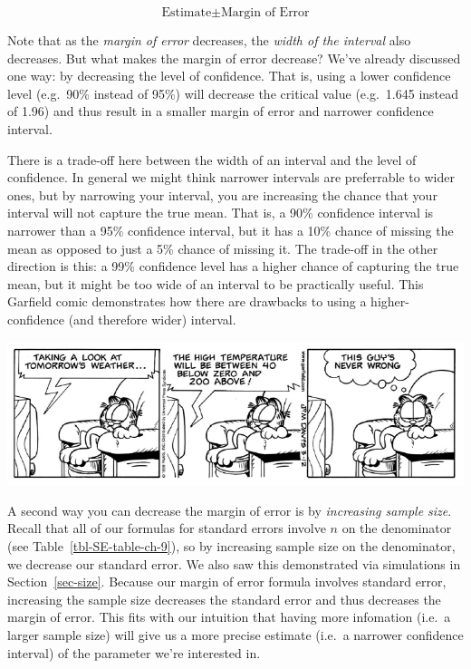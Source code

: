 \documentclass[
  letterpaper,
  DIV=11,
  numbers=noendperiod]{scrreprt}
\theoremstyle{definition}
\theoremstyle{remark}
\begin{document}
\[\text{Estimate} \pm \text{Margin of Error}\]

Note that as the \emph{margin of error} decreases, the \emph{width of
the interval} also decreases. But what makes the margin of error
decrease? We've already discussed one way: by decreasing the level of
confidence. That is, using a lower confidence level (e.g.~90\% instead
of 95\%) will decrease the critical value (e.g.~1.645 instead of 1.96)
and thus result in a smaller margin of error and narrower confidence
interval.

There is a trade-off here between the width of an interval and the level
of confidence. In general we might think narrower intervals are
preferrable to wider ones, but by narrowing your interval, you are
increasing the chance that your interval will not capture the true mean.
That is, a 90\% confidence interval is narrower than a 95\% confidence
interval, but it has a 10\% chance of missing the mean as opposed to
just a 5\% chance of missing it. The trade-off in the other direction is
this: a 99\% confidence level has a higher chance of capturing the true
mean, but it might be too wide of an interval to be practically useful.
This Garfield comic demonstrates how there are drawbacks to using a
higher-confidence (and therefore wider) interval.

\includegraphics{images/garfield_comic.png}

A second way you can decrease the margin of error is by \emph{increasing
sample size}. Recall that all of our formulas for standard errors
involve \(n\) on the denominator (see Table~\ref{tbl-SE-table-ch-9}), so
by increasing sample size on the denominator, we decrease our standard
error. We also saw this demonstrated via simulations in
Section~\ref{sec-size}. Because our margin of error formula involves
standard error, increasing the sample size decreases the standard error
and thus decreases the margin of error. This fits with our intuition
that having more infomation (i.e.~a larger sample size) will give us a
more precise estimate (i.e.~a narrower confidence interval) of the
parameter we're interested in.
\end{document}
